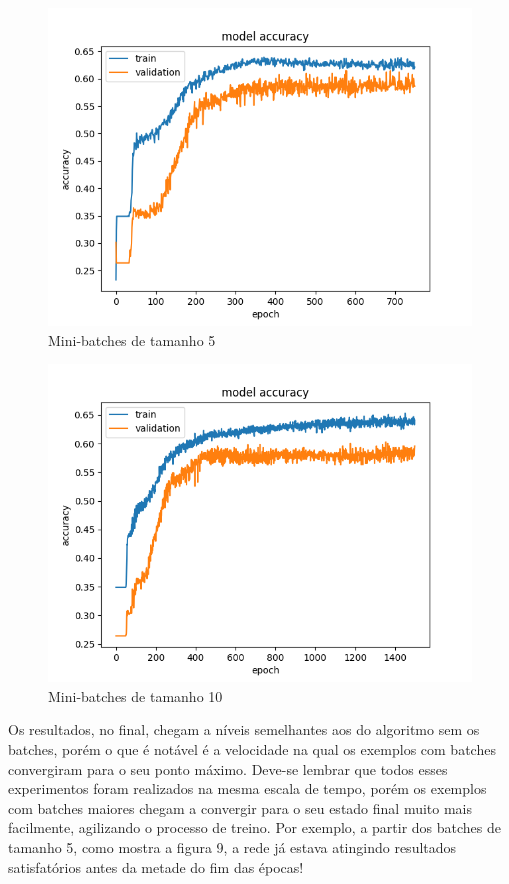 \documentclass[11pt]{article}
\begin{document}
\begin{figure}
	\includegraphics[width=\linewidth]{exp/Figure_9.png}
	\caption{Mini-batches de tamanho 5}
	\label{fig:f4}
\end{figure}

\begin{figure}
	\includegraphics[width=\linewidth]{exp/Figure_10.png}
	\caption{Mini-batches de tamanho 10}
	\label{fig:f4}
\end{figure}

Os resultados, no final, chegam a níveis semelhantes aos do algoritmo sem os batches, porém o que é notável é a velocidade na qual os exemplos com batches convergiram para o seu ponto máximo. Deve-se lembrar que todos esses experimentos foram realizados na mesma escala de tempo, porém os exemplos com batches maiores chegam a convergir para o seu estado final muito mais facilmente, agilizando o processo de treino. Por exemplo, a partir dos batches de tamanho 5, como mostra a figura 9, a rede já estava atingindo resultados satisfatórios antes da metade do fim das épocas!
\end{document}

